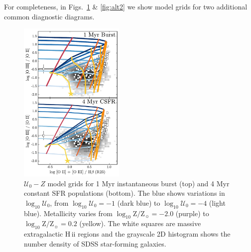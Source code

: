 \documentclass[twocolumn, tighten]{aastex61}
\newcommand{\logten}{\ensuremath{\log_{10}}}
\newcommand{\hii}{H\,{\sc ii}\xspace}
\newcommand{\logZeq}[1]{\ensuremath{\logten \mathrm{Z}/\mathrm{Z}_{\sun} = #1}}
\newcommand{\U}{\ensuremath{\mathcal{U}_{0}}}
\newcommand{\logU}{\ensuremath{\logten \mathcal{U}_0}}
\begin{document}
For completeness, in Figs.~\ref{fig:alt1} \& \ref{fig:alt2} we show model grids for two additional common diagnostic diagrams.
\begin{figure}
  \begin{centering}
    \includegraphics[width=0.45\textwidth]{f20a.pdf}
    \caption{$\U-Z$ model grids for 1 Myr instantaneous burst (top) and 4 Myr constant SFR populations (bottom). The blue shows variations in \logU{}, from $\logU{}=-1$ (dark blue) to $\logU{}=-4$ (light blue). Metallicity varies from \logZeq{-2.0} (purple) to \logZeq{0.2} (yellow). The white squares are massive extragalactic \hii regions and the grayscale 2D histogram shows the number density of SDSS star-forming galaxies.}
    \label{fig:alt1}
  \end{centering}
\end{figure}
\end{document}
